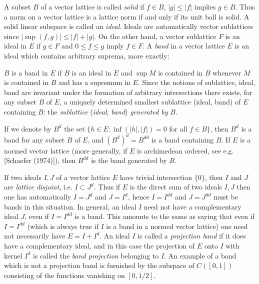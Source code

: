 A subset $ B $ of a vector lattice is called \emph{solid} if $ f \in B $, $ |g| \leq |f| $ implies $ g \in B $.
Thus a norm on a vector lattice is a lattice norm if and only if its unit ball is solid.
A solid linear subspace is called an \emph{ideal}.
Ideals are automatically vector sublattices since $ |\sup(f,g)| \leq |f| + |g| $.
On the other hand, a vector sublattice $ F $ is an ideal in $ E $ if $ g \in F $ and $ 0 \leq f \leq g $ imply $ f \in F $.
A \emph{band} in a vector lattice $ E $ is an ideal which contains arbitrary suprema, more exactly: 


\pagebreak

$ B $ is a band in $ E $ if $ B $ is an ideal in $ E $ and $ \sup M $ is contained in $ B $ whenever $ M $ is contained in $ B $ and has a supremum in $ E $.
Since the notions of sublattice, ideal, band are invariant under the formation of arbitrary intersections there exists, for any subset $ B $ of $ E $, a uniquely determined smallest sublattice (ideal, band) of $ E $ containing $ B $: the \emph{sublattice} (\emph{ideal}, \emph{band}) \emph{generated by} $ B $.

If we denote by $ B^{d} $ the set $ \{h \in E \colon \inf(|h|,|f|) = 0 \text{ for all } f \in B\} $, then $ B^{d} $ is a band for any subset $ B $ of $ E $, and $ (B^{d})^{d} = B^{dd} $ is a band containing $ B $.
If $ E $ is a normed vector lattice (more generally, if $ E $ is archimedean ordered, see e.g. [Schaefer (1974)]), then $ B^{dd} $ is the band generated by $ B $.

If two ideals $ I, J $ of a vector lattice $ E $ have trivial intersection $ \{0\} $, then $ I $ and $ J $ are \emph{lattice disjoint}, i.e. $ I \subset J^{d} $.
Thus if $ E $ is the direct sum of two ideals $ I, J $ then one has automatically $ I = J^{d} $ and $ J = I^{d} $, hence $ I = I^{dd} $ and $ J = J^{dd} $ must be bands in this situation.
In general, an ideal $ I $ need not have a complementary ideal $ J $, even if $ I = I^{dd} $ is a band.
This amounts to the same as saying that even if $ I = I^{dd} $ (which is always true if $ I $ is a band in a normed vector lattice) one need not necessarily have $ E = I + I^{d} $.
An ideal $ I $ is called a \emph{projection band} if it does have a complementary ideal, and in this case the projection of $ E $ onto $ I $ with kernel $ I^{d} $ is called the \emph{band projection} belonging to $ I $.
An example of a band which is not a projection band is furnished by the subspace of $ C([0,1]) $ consisting of the functions vanishing on $ [0,1/2] $.

